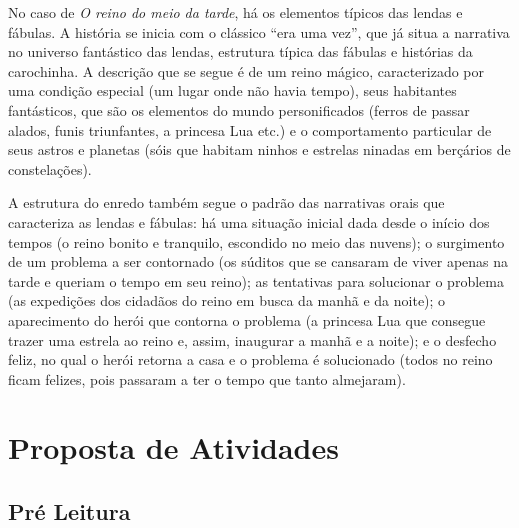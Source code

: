 \documentclass[11pt]{extarticle}
\begin{document}
No caso de \textit{O reino do meio da tarde}, há os elementos típicos das lendas e fábulas.
A história se inicia com o clássico ``era uma vez'', que já situa a narrativa no universo fantástico das lendas, estrutura típica das fábulas e histórias da carochinha. A descrição que se segue é de um reino mágico, caracterizado por uma condição especial (um lugar onde não havia tempo), seus habitantes fantásticos, que são os elementos do mundo personificados (ferros de passar alados, funis triunfantes, a princesa Lua etc.) e o comportamento particular de seus astros e planetas (sóis que habitam ninhos e estrelas ninadas em berçários de constelações).

A estrutura do enredo também segue o padrão das narrativas orais que caracteriza as lendas e fábulas: há uma situação inicial dada desde o início dos tempos (o reino bonito e tranquilo, escondido no meio das nuvens); o surgimento de um problema a ser contornado (os súditos que se cansaram de viver apenas na tarde e queriam o tempo em seu reino); as tentativas para solucionar o problema (as expedições dos cidadãos do reino em busca da manhã e da noite); o aparecimento do herói que contorna o problema (a princesa Lua que consegue trazer uma estrela ao reino e, assim, inaugurar a manhã e a noite); e o desfecho feliz, no qual o herói retorna a casa e o problema é solucionado (todos no reino ficam felizes, pois passaram a ter o tempo que tanto almejaram).

\section{Proposta de Atividades}
\subsection{Pré Leitura}

\end{document}
